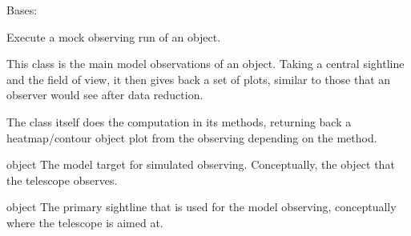 \documentclass[letterpaper,10pt,english]{sphinxmanual}
\begin{document}
\begin{fulllineitems}
\label{\detokenize{model_observing:model_observing.ObservingRun}}
Bases: 

Execute a mock observing run of an object.

This class is the main model observations of an object. Taking a
central sightline and the field of view, it then gives back a set of
plots, similar to those that an observer would see after data reduction.

The class itself does the computation in its methods, returning back
a heatmap/contour object plot from the observing depending on the method.

\begin{fulllineitems}
\label{\detokenize{model_observing:model_observing.ObservingRun.self.observe_target}}
{\hyperref[\detokenize{model_observing:model_observing.ProtostarModel}]{}} object \textendash{} The model target for simulated observing. Conceptually, the object
that the telescope observes.

\end{fulllineitems}


\begin{fulllineitems}
\label{\detokenize{model_observing:model_observing.ObservingRun.self.sightline}}
{\hyperref[\detokenize{model_observing:model_observing.Sightline}]{}} object \textendash{} The primary sightline that is used for the model observing,
conceptually where the telescope is aimed at.

\end{fulllineitems}



\end{fulllineitems}
\end{document}
